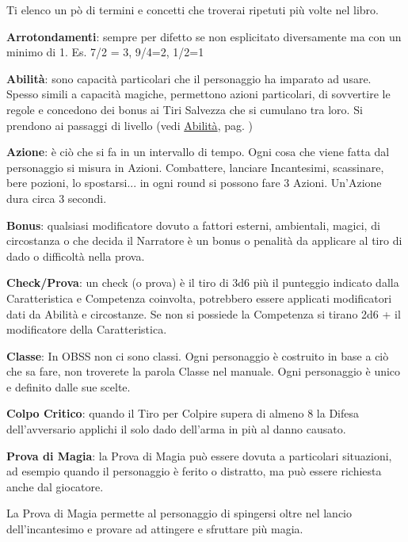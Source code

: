 \begin{multicols}{2}

Ti elenco un pò di termini e concetti che troverai ripetuti più volte nel libro.

\medskip

\textbf{Arrotondamenti}: sempre per difetto se non esplicitato diversamente ma con un minimo di 1. Es. 7/2 = 3, 9/4=2, 1/2=1

\textbf{Abilità}: sono capacità particolari che il personaggio ha imparato ad usare. Spesso simili a capacità magiche, permettono azioni particolari, di sovvertire le regole e concedono dei bonus ai Tiri Salvezza che si cumulano tra loro. Si prendono ai passaggi di livello (vedi \hyperlink{abilita}{Abilità}, pag. \pageref{abilita})

\textbf{Azione}:  è ciò che si fa in un intervallo di tempo. Ogni cosa che viene fatta dal personaggio si misura in Azioni. Combattere, lanciare Incantesimi, scassinare, bere pozioni, lo spostarsi... in ogni round si possono fare 3 Azioni. Un'Azione dura circa 3 secondi.

\textbf{Bonus}: qualsiasi modificatore dovuto a fattori esterni, ambientali, magici, di circostanza o che decida il Narratore è un bonus o penalità da applicare al tiro di dado o difficoltà nella prova.

\textbf{Check/Prova}: un check (o prova) è il tiro di 3d6 più il punteggio indicato dalla Caratteristica e Competenza coinvolta, potrebbero essere applicati modificatori dati da Abilità e circostanze. Se non si possiede la Competenza si tirano 2d6 + il modificatore della Caratteristica.

\textbf{Classe}: In OBSS non ci sono classi. Ogni personaggio è costruito in base a ciò che sa fare, non troverete la parola Classe nel manuale. Ogni personaggio è unico e definito dalle sue scelte.

\textbf{Colpo Critico}: quando il Tiro per Colpire supera di almeno 8 la Difesa dell'avversario applichi il solo dado dell'arma in più al danno causato.

\textbf{Prova di Magia}: la Prova di Magia può essere dovuta a particolari situazioni, ad esempio quando il personaggio è ferito o distratto, ma può essere richiesta anche dal giocatore.

La Prova di Magia permette al personaggio di spingersi oltre nel lancio dell'incantesimo e provare ad attingere e sfruttare più magia.


\end{multicols}
